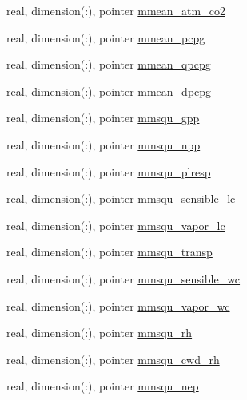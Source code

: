 \begin{DoxyCompactItemize}
real, dimension(\+:), pointer \hyperlink{structed__state__vars_1_1edtype_a93421907595579336835ce28d8c80373}{mmean\+\_\+atm\+\_\+co2}
\item 
real, dimension(\+:), pointer \hyperlink{structed__state__vars_1_1edtype_adb8056693f488781e8bb72cd1f44bc3e}{mmean\+\_\+pcpg}
\item 
real, dimension(\+:), pointer \hyperlink{structed__state__vars_1_1edtype_a0a3f484e0130b3035f91a76b94eda451}{mmean\+\_\+qpcpg}
\item 
real, dimension(\+:), pointer \hyperlink{structed__state__vars_1_1edtype_ae08f0553a52b836c712b1819bdd7f165}{mmean\+\_\+dpcpg}
\item 
real, dimension(\+:), pointer \hyperlink{structed__state__vars_1_1edtype_aa95558ba429860645ce6cbf0d9cdd2ff}{mmsqu\+\_\+gpp}
\item 
real, dimension(\+:), pointer \hyperlink{structed__state__vars_1_1edtype_a949889951e56fe5fafba80b670d17c3b}{mmsqu\+\_\+npp}
\item 
real, dimension(\+:), pointer \hyperlink{structed__state__vars_1_1edtype_aef8440ba74e380e9f5ebc7c06aeb9545}{mmsqu\+\_\+plresp}
\item 
real, dimension(\+:), pointer \hyperlink{structed__state__vars_1_1edtype_a3e690a4b5464025a1e2e7b7043719f43}{mmsqu\+\_\+sensible\+\_\+lc}
\item 
real, dimension(\+:), pointer \hyperlink{structed__state__vars_1_1edtype_ae99fb61960db5adfd0f6b8d71fc2a727}{mmsqu\+\_\+vapor\+\_\+lc}
\item 
real, dimension(\+:), pointer \hyperlink{structed__state__vars_1_1edtype_aa9e348a6fd79133b95265df156727b7b}{mmsqu\+\_\+transp}
\item 
real, dimension(\+:), pointer \hyperlink{structed__state__vars_1_1edtype_a963a37c1385ccbd50bfc9efeaae2a8de}{mmsqu\+\_\+sensible\+\_\+wc}
\item 
real, dimension(\+:), pointer \hyperlink{structed__state__vars_1_1edtype_a0bdc60022f938f1b1ee6851d8f36595a}{mmsqu\+\_\+vapor\+\_\+wc}
\item 
real, dimension(\+:), pointer \hyperlink{structed__state__vars_1_1edtype_a29df16b01b20629fc754ab322b648fe2}{mmsqu\+\_\+rh}
\item 
real, dimension(\+:), pointer \hyperlink{structed__state__vars_1_1edtype_a64ab487880a1fbda1b593c50c23b00af}{mmsqu\+\_\+cwd\+\_\+rh}
\item 
real, dimension(\+:), pointer \hyperlink{structed__state__vars_1_1edtype_a8cf809bcd4ab4c8c06a86ecbb58f8b5f}{mmsqu\+\_\+nep}
\item 

\end{DoxyCompactItemize}

